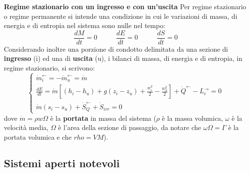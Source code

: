 \newline
\newline
\newline
\textbf{Regime stazionario con un ingresso e con un'uscita}\newline
Per regime stazionario o regime permanente si intende una condizione in cui le variazioni di massa, di energia e di entropia nel sistema sono nulle nel tempo:
\[
    \frac{dM}{dt} = 0 \;\;\;\;\;\;\;\;\;\; \frac{dE}{dt} = 0 \;\;\;\;\;\;\;\;\;\; \frac{dS}{dt} = 0
\]
Considerando inoltre una porzione di condotto delimitata da una sezione di \textbf{ingresso} (i) ed una di
\textbf{uscita} (u), i bilanci di massa, di energia e di entropia, in regime stazionario, si scrivono: 
\[
    \begin{cases}
        \dot{m}_i^\leftarrow = -\dot{m}_u^\leftarrow  = \dot{m}\\
        \frac{dE}{dt} = \dot{m}\left[ (h_i - h_u) + g(z_i-z_u) + \frac{w_i^2}{2} - \frac{w_u^2}{2}\right] + \dot{Q}^\leftarrow -L_e^\rightarrow = 0\\
        \dot{m}(s_i-s_u) + \dot{S}_Q^\leftarrow  + \dot{S}_{irr} = 0
    \end{cases}
\]
dove $\dot{m} = \rho w \Omega$ è la \textbf{portata} in massa del sistema ($\rho$ è la massa volumica, $\omega$ è la velocità media, $\Omega$ è l'area della sezione di passaggio, da notare che $\omega \Omega = \Gamma$ è la portata volumica e che $rho = VM$).
\subsection{Sistemi aperti notevoli}
